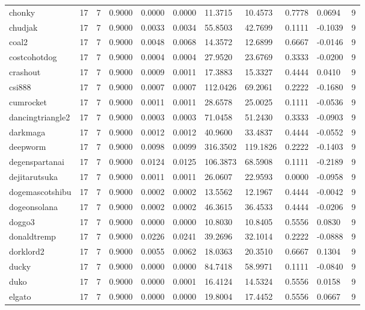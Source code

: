 \begin{table}[htbp]
\begin{tabular}{lllllllllll}
chonky & 17 & 7 & 0.9000 & 0.0000 & 0.0000 & 11.3715 & 10.4573 & 0.7778 & 0.0694 & 9 \\
chudjak & 17 & 7 & 0.9000 & 0.0033 & 0.0034 & 55.8503 & 42.7699 & 0.1111 & -0.1039 & 9 \\
coal2 & 17 & 7 & 0.9000 & 0.0048 & 0.0068 & 14.3572 & 12.6899 & 0.6667 & -0.0146 & 9 \\
costcohotdog & 17 & 7 & 0.9000 & 0.0004 & 0.0004 & 27.9520 & 23.6769 & 0.3333 & -0.0200 & 9 \\
crashout & 17 & 7 & 0.9000 & 0.0009 & 0.0011 & 17.3883 & 15.3327 & 0.4444 & 0.0410 & 9 \\
csi888 & 17 & 7 & 0.9000 & 0.0007 & 0.0007 & 112.0426 & 69.2061 & 0.2222 & -0.1680 & 9 \\
cumrocket & 17 & 7 & 0.9000 & 0.0011 & 0.0011 & 28.6578 & 25.0025 & 0.1111 & -0.0536 & 9 \\
dancingtriangle2 & 17 & 7 & 0.9000 & 0.0003 & 0.0003 & 71.0458 & 51.2430 & 0.3333 & -0.0903 & 9 \\
darkmaga & 17 & 7 & 0.9000 & 0.0012 & 0.0012 & 40.9600 & 33.4837 & 0.4444 & -0.0552 & 9 \\
deepworm & 17 & 7 & 0.9000 & 0.0098 & 0.0099 & 316.3502 & 119.1826 & 0.2222 & -0.1403 & 9 \\
degenspartanai & 17 & 7 & 0.9000 & 0.0124 & 0.0125 & 106.3873 & 68.5908 & 0.1111 & -0.2189 & 9 \\
dejitarutsuka & 17 & 7 & 0.9000 & 0.0011 & 0.0011 & 26.0607 & 22.9593 & 0.0000 & -0.0958 & 9 \\
dogemascotshibu & 17 & 7 & 0.9000 & 0.0002 & 0.0002 & 13.5562 & 12.1967 & 0.4444 & -0.0042 & 9 \\
dogeonsolana & 17 & 7 & 0.9000 & 0.0002 & 0.0002 & 46.3615 & 36.4533 & 0.4444 & -0.0206 & 9 \\
doggo3 & 17 & 7 & 0.9000 & 0.0000 & 0.0000 & 10.8030 & 10.8405 & 0.5556 & 0.0830 & 9 \\
donaldtremp & 17 & 7 & 0.9000 & 0.0226 & 0.0241 & 39.2696 & 32.1014 & 0.2222 & -0.0888 & 9 \\
dorklord2 & 17 & 7 & 0.9000 & 0.0055 & 0.0062 & 18.0363 & 20.3510 & 0.6667 & 0.1304 & 9 \\
ducky & 17 & 7 & 0.9000 & 0.0000 & 0.0000 & 84.7418 & 58.9971 & 0.1111 & -0.0840 & 9 \\
duko & 17 & 7 & 0.9000 & 0.0000 & 0.0001 & 16.4124 & 14.5324 & 0.5556 & 0.0158 & 9 \\
elgato & 17 & 7 & 0.9000 & 0.0000 & 0.0000 & 19.8004 & 17.4452 & 0.5556 & 0.0667 & 9 \\

\end{tabular}
\end{table}
